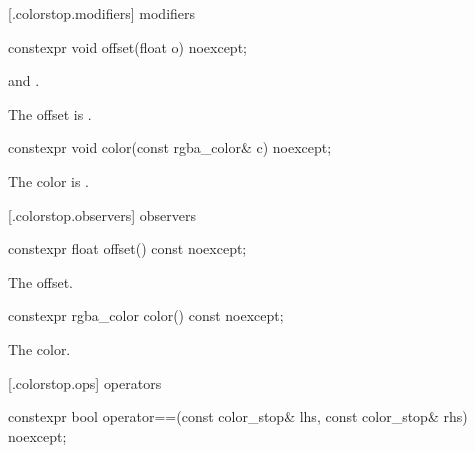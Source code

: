  [\iotwod.colorstop.modifiers] { modifiers}

%
\begin{itemdecl}
constexpr void offset(float o) noexcept;
\end{itemdecl}
\begin{itemdescr}
\pnum
\requires
{} and .

\pnum
\effects
The offset is .
\end{itemdescr}

%
\begin{itemdecl}
constexpr void color(const rgba_color& c) noexcept;
\end{itemdecl}
\begin{itemdescr}
\pnum
\effects
The color is .
\end{itemdescr}

 [\iotwod.colorstop.observers] { observers}

%
\begin{itemdecl}
constexpr float offset() const noexcept;
\end{itemdecl}
\begin{itemdescr}
\pnum
\returns
The offset.
\end{itemdescr}

%
\begin{itemdecl}
constexpr rgba_color color() const noexcept;
\end{itemdecl}
\begin{itemdescr}
\pnum
\returns
The color.
\end{itemdescr}

 [\iotwod.colorstop.ops] { operators}

%
\begin{itemdecl}
constexpr bool operator==(const color_stop& lhs, const color_stop& rhs)
  noexcept;
\end{itemdecl}
\begin{itemdescr}
\pnum
\returns
{}
\end{itemdescr}
